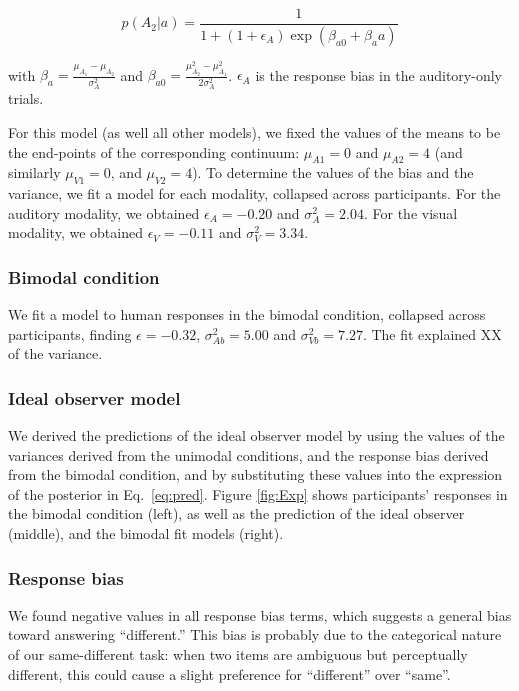 \documentclass[10pt,letterpaper]{article}
\begin{document}
\begin{equation}
p(A_2 | a)=\frac{1}{1+(1+\epsilon_A)\exp(\beta_{a0}+\beta_aa)}
\end{equation}

\noindent with $\beta_a=\frac{\mu_{A_1}-\mu_{A_2}}{\sigma^2_{A}}$ and  $\beta_{a0}=\frac{\mu^2_{A_2}-\mu^2_{A_1}}{2\sigma^2_{A}}$. $\epsilon_A$ is the response bias in the auditory-only trials.

For this model (as well all other models), we fixed the values of the means to be the end-points of the corresponding continuum: $\mu_{A1}=0$ and $\mu_{A2}=4$ (and similarly $\mu_{V1}=0$, and $\mu_{V2}=4$). To determine the values of the bias and the variance, we fit a model for each modality, collapsed across participants. For the auditory modality, we obtained $\epsilon_A=-0.20$ and $\sigma^2_A=2.04$. For the visual modality, we obtained $\epsilon_V=-0.11$ and $\sigma^2_V=3.34$.

\subsubsection{Bimodal condition}
We fit a model to human responses in the bimodal condition, collapsed across participants, finding $\epsilon=-0.32$, $\sigma^2_{Ab}=5.00$ and $\sigma^2_{Vb}=7.27$. The fit explained XX of the variance.

\subsubsection{Ideal observer model}

We derived the predictions of the ideal observer model by using the values of the variances derived from the unimodal conditions, and the response bias derived from the bimodal condition, and by substituting these values into the expression of the posterior in Eq.~\ref{eq:pred}.
Figure \ref{fig:Exp} shows participants' responses in the bimodal condition (left), as well as the prediction of the ideal observer (middle), and the bimodal fit models (right).

\subsubsection{Response bias}

We found negative values in all response bias terms, which suggests a general bias toward answering ``different.''  This bias is probably due to the categorical nature of our same-different task: when two items are ambiguous but perceptually different, this could cause a slight preference for ``different'' over ``same''.
\end{document}
